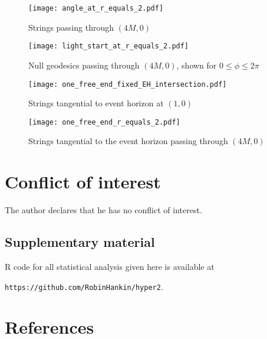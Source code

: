 \documentclass[review]{elsarticle}
\begin{document}
\begin{figure}[p]
\centering
\texttt{[image: angle\_at\_r\_equals\_2.pdf]} %
\caption{Strings passing through $(4M,0)$}
\label{strings_r_equals_2}
\end{figure}

\begin{figure}[p]
\centering
\texttt{[image: light\_start\_at\_r\_equals\_2.pdf]} %
\caption{Null geodesics passing through $(4M,0)$, shown for
  $0\leqslant\phi\leqslant 2\pi$}
\label{light_r_equals_2}
\end{figure}

\begin{figure}[p] %
\centering
\texttt{[image: one\_free\_end\_fixed\_EH\_intersection.pdf]}
\caption{Strings tangential to event horizon at $(1,0)$}
\label{fixed_EH_intersection}
\end{figure}

\begin{figure}[p] %
\centering
\texttt{[image: one\_free\_end\_r\_equals\_2.pdf]}
\caption{Strings tangential to the event horizon passing through $(4M,0)$}
\label{one_free_end_r_equals_2}
\end{figure}



 \section*{Conflict of interest}
 The author declares that he has no conflict of interest.

\subsection*{Supplementary material}

R code for all statistical analysis given here is available at

{\tt https://github.com/RobinHankin/hyper2}.

\section*{References}


\end{document}
